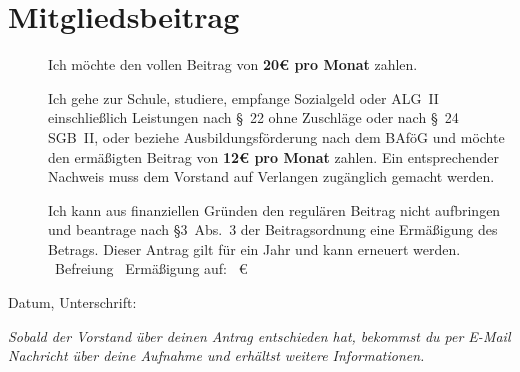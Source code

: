 \documentclass[a5paper,10pt,headings=small]{scrartcl}
\newcommand{\signskip}{\rule{0pt}{18pt}}
\newcommand{\hinweis}[1]{\emph{#1}}
\begin{document}
\section*{Mitgliedsbeitrag}
\begin{description}
  \item[\Square] Ich möchte den vollen Beitrag von \textbf{20€ pro Monat} zahlen.
  \item[\Square] Ich gehe zur Schule, studiere, empfange Sozialgeld oder ALG~II
    einschließ\-lich Leistungen nach §~22 ohne Zuschläge oder nach §~24 SGB~II,
    oder beziehe Ausbildungsförderung nach dem BAföG und möchte den ermäßigten
    Beitrag von \textbf{12€ pro Monat} zahlen. Ein entsprechender Nachweis muss
    dem Vorstand auf Verlangen zugänglich gemacht werden.
  \item[\Square] Ich kann aus finanziellen Gründen den regulären Beitrag nicht
    aufbringen und beantrage nach §3~Abs.~3 der Beitragsordnung eine Ermäßigung
    des Betrags. Dieser Antrag gilt für ein Jahr und kann erneuert werden. \\
    \Square~Befreiung \hfill
    \Square~Ermäßigung auf: \hrulefill~€\hfill\phantom{a}
\end{description}

\vfill

Datum, Unterschrift: \hrulefill\signskip

\hinweis{Sobald der Vorstand über deinen Antrag entschieden hat, bekommst du per
E-Mail Nachricht über deine Aufnahme und erhältst weitere Informationen.}
\end{document}
